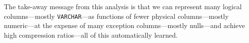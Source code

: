 The take-away message from this analysis is that we can represent many logical columns---mostly \verb|VARCHAR|---as functions of fewer physical columns---mostly numeric---at the expense of many exception columns---mostly nulls---and achieve high compression ratios---all of this automatically learned.


